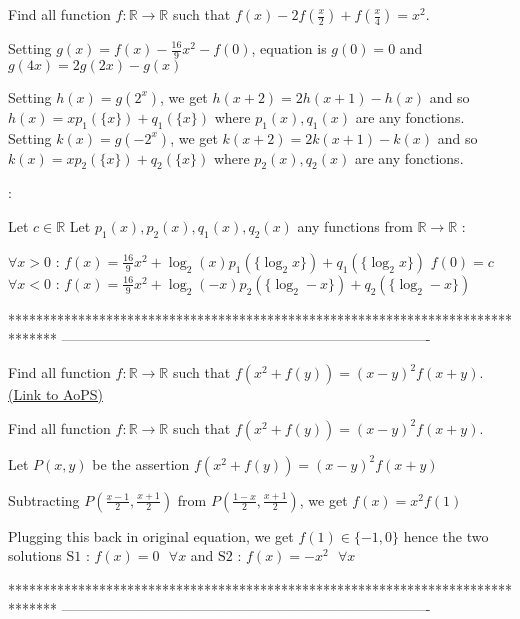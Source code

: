 \begin{solution}
	\begin{tcolorbox}Find all function $f: \mathbb{R}\to\mathbb{R}$ such that $f(x)-2f(\frac{x}{2})+f(\frac{x}{4})=x^2$.\end{tcolorbox}
Setting $g(x)=f(x)-\frac{16}9x^2-f(0)$, equation is $g(0)=0$ and $g(4x)=2g(2x)-g(x)$

Setting $h(x)=g(2^x)$, we get $h(x+2)=2h(x+1)-h(x)$ and so $h(x)=xp_1(\{x\})+q_1(\{x\})$ where $p_1(x),q_1(x)$ are any fonctions.
Setting $k(x)=g(-2^x)$, we get $k(x+2)=2k(x+1)-k(x)$ and so $k(x)=xp_2(\{x\})+q_2(\{x\})$ where $p_2(x),q_2(x)$ are any fonctions.

 :

Let $c\in\mathbb R$
Let $p_1(x),p_2(x),q_1(x),q_2(x)$ any functions from $\mathbb R\to\mathbb R$ :

$\forall x>0$ : $f(x)=\frac{16}9x^2+\log_2(x)p_1(\{\log_2 x\})+q_1(\{\log_2 x\})$
$f(0)=c$
$\forall x<0$ : $f(x)=\frac{16}9x^2+\log_2(-x)p_2(\{\log_2 -x\})+q_2(\{\log_2 -x\})$
\end{solution}
*******************************************************************************
-------------------------------------------------------------------------------

\begin{problem}
	Find all function $f: \mathbb{R}\to\mathbb{R}$ such that $f(x^2+f(y))=(x-y)^2f(x+y)$.
	\flushright \href{https://artofproblemsolving.com/community/c6h615312}{(Link to AoPS)}
\end{problem}



\begin{solution}
	\begin{tcolorbox}Find all function $f: \mathbb{R}\to\mathbb{R}$ such that $f(x^2+f(y))=(x-y)^2f(x+y)$.\end{tcolorbox}
Let $P(x,y)$ be the assertion $f(x^2+f(y))=(x-y)^2f(x+y)$

Subtracting $P(\frac{x-1}2,\frac{x+1}2)$ from $P(\frac{1-x}2,\frac{x+1}2)$, we get $f(x)=x^2f(1)$

Plugging this back in original equation, we get $f(1)\in\{-1,0\}$ hence the two solutions $\boxed{\text{S1 : }f(x)=0\text{  }\forall x}$ and $\boxed{\text{S2 : }f(x)=-x^2\text{  }\forall x}$
\end{solution}
*******************************************************************************
-------------------------------------------------------------------------------

